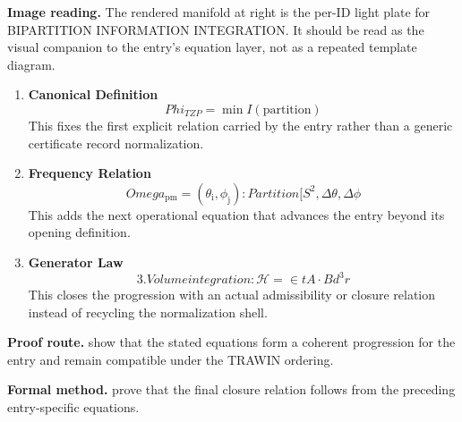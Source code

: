 \begin{samepage}
\noindent\begin{minipage}[t]{0.45\linewidth}
\vspace{0pt}
\raggedright
\scriptsize\textbf{Image reading.} The rendered manifold at right is the per-ID light plate for BIPARTITION INFORMATION INTEGRATION. It should be read as the visual companion to the entry's equation layer, not as a repeated template diagram.\par
\end{minipage}\hfill
\begin{minipage}[t]{0.53\linewidth}
\vspace*{-0.10in}
\raggedright
{}
\end{minipage}
\end{samepage}

\clearpage


\begin{enumerate}[leftmargin=1.6em,itemsep=9pt,topsep=6pt]
\item \textbf{Canonical Definition}
\[
Phi_{TZP} = \min I(\text{partition})
\]
This fixes the first explicit relation carried by the entry rather than a generic certificate record normalization.

\item \textbf{Frequency Relation}
\[
Omega_\mathrm{pm} = {(\theta_{\mathrm{i}}, \phi_{\mathrm{j}}) : Partition[S^{2}, {\Delta\theta, \Delta\phi}}
\]
This adds the next operational equation that advances the entry beyond its opening definition.

\item \textbf{Generator Law}
\[
3. Volume integration: \mathcal{H} = \in t A\cdot B d^{3}r
\]
This closes the progression with an actual admissibility or closure relation instead of recycling the normalization shell.
\end{enumerate}

\textbf{Proof route.} show that the stated equations form a coherent progression for the entry and remain compatible under the TRAWIN ordering.

\textbf{Formal method.} prove that the final closure relation follows from the preceding entry-specific equations.

\medskip
{}

